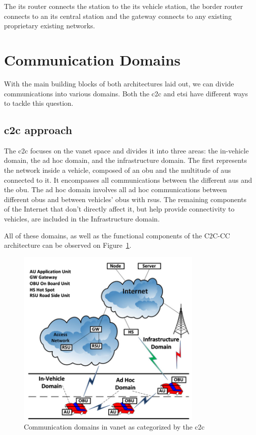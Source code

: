 \begin{enumerate}
The \gls{its} router connects the station to the \gls{its} vehicle station, the border router connects to an \gls{its} central station and the gateway connects to any existing proprietary existing networks.

\end{enumerate}


\section{Communication Domains}
\label{sec:VANET_communication_domains}

With the main building blocks of both architectures laid out, we can divide communications into various domains. Both the \gls{c2c} and \gls{etsi} have different ways to tackle this question.

\subsection[C2C approach]{\gls{c2c} approach}
The \gls{c2c} focuses on the \gls{vanet} space and divides it into three areas: the in-vehicle domain, the ad hoc domain, and the infrastructure domain.
The first represents the network inside a vehicle, composed of an \gls{obu} and the multitude of \glspl{au} connected to it. It encompasses all communications between the different \glspl{au} and the \gls{obu}.
The ad hoc domain involves all ad hoc communications between different \glspl{obu} and between vehicles' \glspl{obu} with \glspl{rsu}.
The remaining components of the Internet that don't directly affect it, but help provide connectivity to vehicles, are included in the Infrastructure domain.

All of these domains, as well as the functional components of the C2C-CC architecture can be observed on Figure~\ref{fig:c2c_domain}.

\begin{figure}[htbp]
	\centering
	\includegraphics[width=0.8\textwidth]{Chapters/Figures/VANETs/C2C-CC_domains.png}
	\caption{Communication domains in \gls{vanet} as categorized by the \gls{c2c}~\cite{al-sultan_comprehensive_2014}}
	\label{fig:c2c_domain}
\end{figure}

